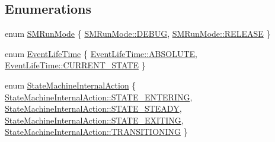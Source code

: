 \subsection*{Enumerations}
\begin{DoxyCompactItemize}
\item 
enum \hyperlink{namespacesmacc_a3e4f79486ea6ea6342dd3c712d16a4f6}{S\+M\+Run\+Mode} \{ \hyperlink{namespacesmacc_a3e4f79486ea6ea6342dd3c712d16a4f6adc30ec20708ef7b0f641ef78b7880a15}{S\+M\+Run\+Mode\+::\+D\+E\+B\+UG}, 
\hyperlink{namespacesmacc_a3e4f79486ea6ea6342dd3c712d16a4f6a7d649ef069df9885e382417c79f3d5cd}{S\+M\+Run\+Mode\+::\+R\+E\+L\+E\+A\+SE}
 \}
\item 
enum \hyperlink{namespacesmacc_a5063f47926ad2fe25120ed4b1e7b2c7e}{Event\+Life\+Time} \{ \hyperlink{namespacesmacc_a5063f47926ad2fe25120ed4b1e7b2c7ea3a0bc063b6db8cae0361657958be836f}{Event\+Life\+Time\+::\+A\+B\+S\+O\+L\+U\+TE}, 
\hyperlink{namespacesmacc_a5063f47926ad2fe25120ed4b1e7b2c7ea49b599d413671f16f08d0dd18243c294}{Event\+Life\+Time\+::\+C\+U\+R\+R\+E\+N\+T\+\_\+\+S\+T\+A\+TE}
 \}
\item 
enum \hyperlink{namespacesmacc_a0889aff43c93fe5285109819d2898144}{State\+Machine\+Internal\+Action} \{ \hyperlink{namespacesmacc_a0889aff43c93fe5285109819d2898144aef27ae3e54b805b81e1efacea3c02575}{State\+Machine\+Internal\+Action\+::\+S\+T\+A\+T\+E\+\_\+\+E\+N\+T\+E\+R\+I\+NG}, 
\hyperlink{namespacesmacc_a0889aff43c93fe5285109819d2898144aaefffb251a9a48e0e3274e9475d22749}{State\+Machine\+Internal\+Action\+::\+S\+T\+A\+T\+E\+\_\+\+S\+T\+E\+A\+DY}, 
\hyperlink{namespacesmacc_a0889aff43c93fe5285109819d2898144a22bd5bb7935dd66f181d92efc273951e}{State\+Machine\+Internal\+Action\+::\+S\+T\+A\+T\+E\+\_\+\+E\+X\+I\+T\+I\+NG}, 
\hyperlink{namespacesmacc_a0889aff43c93fe5285109819d2898144a5e174e130ee1847f37541ba5786207a3}{State\+Machine\+Internal\+Action\+::\+T\+R\+A\+N\+S\+I\+T\+I\+O\+N\+I\+NG}
 \}
\end{DoxyCompactItemize}
